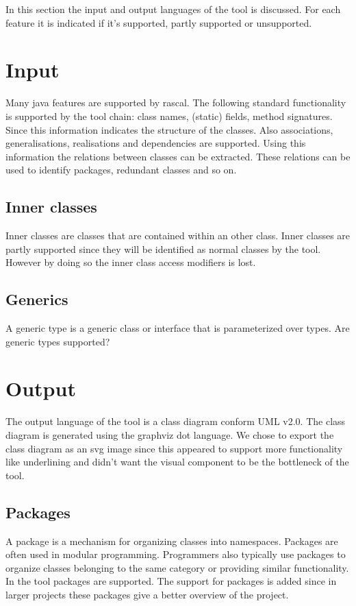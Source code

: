 In this section the input and output languages of the tool is discussed. For each feature it is indicated if it's supported, partly supported or unsupported.

\section{Input}
Many java features are supported by rascal. The following standard functionality is supported by the tool chain: class names, (static) fields, method signatures. Since this information indicates the structure of the classes.
Also associations, generalisations, realisations and
dependencies are supported. Using this information the relations between classes can be extracted. These relations can be used to identify packages, redundant classes and so on.

\subsection*{Inner classes}
Inner classes are classes that are contained within an other class. Inner classes are partly supported since they will be identified as normal classes by the tool. However by doing so the inner class access modifiers is lost.

\subsection*{Generics}
A generic type is a generic class or interface that is parameterized over types.
Are generic types supported?

\newpage

\section{Output}
The output language of the tool is a class diagram conform UML v2.0. The class diagram is generated using the graphviz dot language. We chose to export the class diagram as an svg image since this appeared to support more functionality like underlining and didn't want the visual component to be the bottleneck of the tool.

\subsection*{Packages}
A package is a mechanism for organizing classes into namespaces. Packages are often used in modular programming.  Programmers also typically use packages to organize classes belonging to the same category or providing similar functionality. In the tool packages are supported. The support for packages is added since in larger projects these packages give a better overview of the project.

